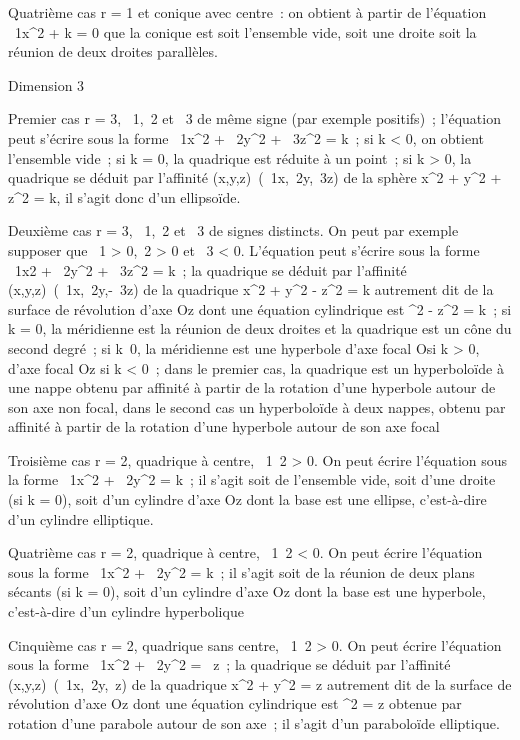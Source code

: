Quatrième cas r = 1 et conique avec centre~: on obtient à partir de
l'équation \lambda~1x^2 + k = 0 que la conique est soit
l'ensemble vide, soit une droite soit la réunion de deux droites
parallèles.

Dimension 3

Premier cas r = 3, \lambda~1,\lambda~2 et \lambda~3 de même
signe (par exemple positifs)~; l'équation peut s'écrire sous la forme
\lambda~1x^2 + \lambda~2y^2 +
\lambda~3z^2 = k~; si k \textless{} 0, on obtient
l'ensemble vide~; si k = 0, la quadrique est réduite à un point~; si k
\textgreater{} 0, la quadrique se déduit par l'affinité
(x,y,z)\mapsto~(\sqrt\lambda~1x,\sqrt\lambda~2y,\sqrt\lambda~3z)
de la sphère x^2 + y^2 + z^2 = k, il
s'agit donc d'un ellipsoïde.

Deuxième cas r = 3, \lambda~1,\lambda~2 et \lambda~3 de signes
distincts. On peut par exemple supposer que \lambda~1 \textgreater{}
0,\lambda~2 \textgreater{} 0 et \lambda~3 \textless{} 0.
L'équation peut s'écrire sous la forme \lambda~1x2 +
\lambda~2y^2 + \lambda~3z^2 = k~; la
quadrique se déduit par l'affinité
(x,y,z)\mapsto~(\sqrt\lambda~1x,\sqrt\lambda~2y,\sqrt-\lambda~3z)
de la quadrique x^2 + y^2 - z^2 = k
autrement dit de la surface de révolution d'axe Oz dont une équation
cylindrique est \rho^2 - z^2 = k~; si k = 0, la
méridienne est la réunion de deux droites et la quadrique est un cône du
second degré~; si k\neq~0, la méridienne est une
hyperbole d'axe focal O\rho si k \textgreater{} 0, d'axe focal Oz si k
\textless{} 0~; dans le premier cas, la quadrique est un hyperboloïde à
une nappe obtenu par affinité à partir de la rotation d'une hyperbole
autour de son axe non focal, dans le second cas un hyperboloïde à deux
nappes, obtenu par affinité à partir de la rotation d'une hyperbole
autour de son axe focal

Troisième cas r = 2, quadrique à centre, \lambda~1\lambda~2
\textgreater{} 0. On peut écrire l'équation sous la forme
\lambda~1x^2 + \lambda~2y^2 = k~; il s'agit
soit de l'ensemble vide, soit d'une droite (si k = 0), soit d'un
cylindre d'axe Oz dont la base est une ellipse, c'est-à-dire d'un
cylindre elliptique.

Quatrième cas r = 2, quadrique à centre, \lambda~1\lambda~2
\textless{} 0. On peut écrire l'équation sous la forme
\lambda~1x^2 + \lambda~2y^2 = k~; il s'agit
soit de la réunion de deux plans sécants (si k = 0), soit d'un cylindre
d'axe Oz dont la base est une hyperbole, c'est-à-dire d'un cylindre
hyperbolique

Cinquième cas r = 2, quadrique sans centre, \lambda~1\lambda~2
\textgreater{} 0. On peut écrire l'équation sous la forme
\lambda~1x^2 + \lambda~2y^2 = \beta~z~; la
quadrique se déduit par l'affinité
(x,y,z)\mapsto~(\sqrt\lambda~1x,\sqrt\lambda~2y,\beta~z)
de la quadrique x^2 + y^2 = z autrement dit de la
surface de révolution d'axe Oz dont une équation cylindrique est
\rho^2 = z obtenue par rotation d'une parabole autour de son
axe~; il s'agit d'un paraboloïde elliptique.


